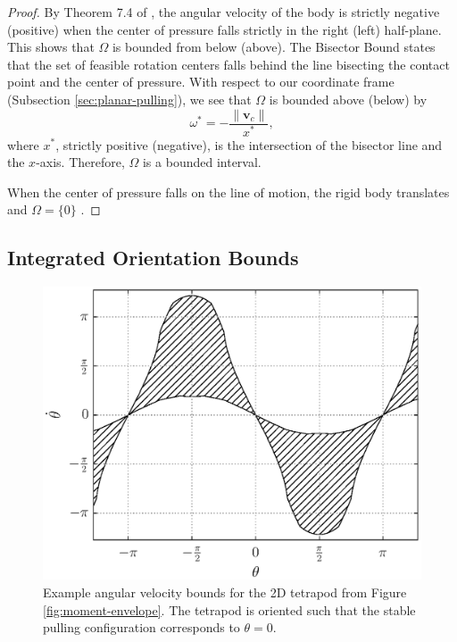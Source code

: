 \documentclass[conference]{IEEEtran}
\begin{document}
\begin{proof}
  By Theorem 7.4 of \cite{Mason}, the angular velocity of the body is
  strictly negative (positive) when the center of pressure falls
  strictly in the right (left) half-plane. This shows that $\Omega$ is
  bounded from below (above). The Bisector Bound \cite{Mason} states
  that the set of feasible rotation centers falls behind the line
  bisecting the contact point and the center of pressure. With respect
  to our coordinate frame (Subsection \ref{sec:planar-pulling}), we
  see that $\Omega$ is bounded above (below) by
  \begin{equation}
    \omega^* = -\frac{\lVert\mathbf{v}_c\rVert}{x^*}, \label{eq:rot-to-ang}
  \end{equation}
  where $x^*$, strictly positive (negative), is the intersection of
  the bisector line and the $x$-axis. Therefore, $\Omega$ is a
  bounded interval.

  When the center of pressure falls on the line of motion, the rigid
  body translates and $\Omega = \{0\}$ \cite{Mason}.
\end{proof}

\subsection{Integrated Orientation Bounds}\label{sec:orientation-bounds}

\begin{figure}[t]
  \centering
    \includegraphics[width=1\linewidth]{fig/omega_bounds}
    \caption{Example angular velocity bounds for the 2D tetrapod from
      Figure \ref{fig:moment-envelope}. The tetrapod is oriented such
      that the stable pulling configuration corresponds to
      $\theta=0$.}
  \label{fig:omega-bounds}
\end{figure}
\end{document}
